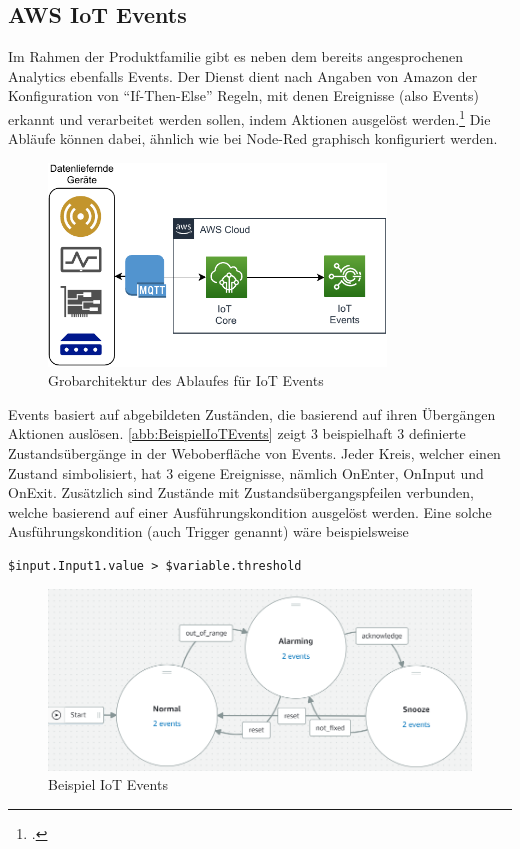 \subsection{AWS IoT Events}
Im Rahmen der \AWSIOT Produktfamilie gibt es neben dem bereits angesprochenen \AWSIOT Analytics ebenfalls \AWSIOT Events.  
Der Dienst dient nach Angaben von Amazon der Konfiguration von \enquote{If-Then-Else} Regeln, mit denen Ereignisse (also Events) erkannt und verarbeitet werden sollen, indem Aktionen ausgelöst werden.\footcite[Vgl.][]{AmazonWebServicesInc..o.J.b} Die Abläufe können dabei, ähnlich wie bei Node-Red graphisch konfiguriert werden. 
\begin{figure}[H]
\centering
\includegraphics[width=0.8\textwidth]{graphics/IoT-Events-general.pdf}
\caption{Grobarchitektur des Ablaufes für IoT Events}
\label{abb:GrobArchitekturIoTEvents}
\end{figure}

\AWSIOT Events basiert auf abgebildeten Zuständen, die basierend auf ihren Übergängen Aktionen auslösen. \autoref{abb:BeispielIoTEvents} zeigt 3 beispielhaft 3 definierte Zustandsübergänge in der Weboberfläche von \AWSIOT Events. Jeder Kreis, welcher einen Zustand simbolisiert, hat 3 eigene Ereignisse, nämlich OnEnter, OnInput und OnExit. Zusätzlich sind Zustände mit Zustandsübergangspfeilen verbunden, welche basierend auf einer Ausführungskondition ausgelöst werden. Eine solche Ausführungskondition (auch Trigger genannt) wäre beispielsweise
\begin{lstlisting}
$input.Input1.value > $variable.threshold
\end{lstlisting}
\begin{figure}[H]
\centering
\includegraphics[width=\textwidth]{graphics/IoT-Events-Demo.png}
\caption{Beispiel IoT Events}
\label{abb:BeispielIoTEvents}
\end{figure}

